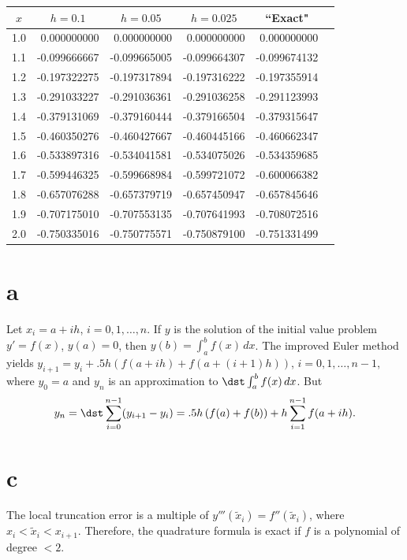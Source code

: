 \documentclass[dvips]{book}
\renewcommand{\exer}[1]{\par\medskip\;\noindent{\color{red}\bf #1.}}
\numberwithin{example}{section}
\numberwithin{equation}{section}
\numberwithin{theorem}{section}
\numberwithin{table}{section}
\numberwithin{figure}{section}
\begin{document}
\exer{3.2.30}
{\small
\begin{tabular}{|c|r|r|r|r|r|}
\hline
\multicolumn{1}{|c|}{$x$}&
\multicolumn{1}{|c|}{$h=0.1$}&
\multicolumn{1}{|c|}{$h=0.05$}&
\multicolumn{1}{|c|}{$h=0.025$}&
\multicolumn{1}{|c|}{``Exact"}\\ \hline
1.0 & 0.000000000 & 0.000000000  &  0.000000000 &  0.000000000 \\
1.1 &-0.099666667 &-0.099665005  & -0.099664307 & -0.099674132 \\
1.2 &-0.197322275 &-0.197317894  & -0.197316222 & -0.197355914 \\
1.3 &-0.291033227 &-0.291036361  & -0.291036258 & -0.291123993 \\
1.4 &-0.379131069 &-0.379160444  & -0.379166504 & -0.379315647 \\
1.5 &-0.460350276 &-0.460427667  & -0.460445166 & -0.460662347 \\
1.6 &-0.533897316 &-0.534041581  & -0.534075026 & -0.534359685 \\
1.7 &-0.599446325 &-0.599668984  & -0.599721072 & -0.600066382 \\
1.8 &-0.657076288 &-0.657379719  & -0.657450947 & -0.657845646 \\
1.9 &-0.707175010 &-0.707553135  & -0.707641993 & -0.708072516 \\
2.0 &-0.750335016 &-0.750775571  & -0.750879100 & -0.751331499 \\
\hline
\end{tabular}}


\exer{3.2.32}
\part{a}
Let $x_i=a+ih$, $i=0,1,\dots,n$. If $y$ is the solution of the initial
value problem $y'=f(x)$, $y(a)=0$, then $y(b)=\int_a^bf(x)\,dx$.
The improved  Euler method yields
$y_{i+1}=y_i+.5h\left(f(a+ih)+f(a+(i+1)h)\right)$,
$i=0,1,\dots,n-1$,
where $y_0=a$ and $y_n$ is an approximation to $\dst\int_a^bf(x)\,dx$.
But
$$
y_n=\dst\sum_{i=0}^{n-1}(y_{i+1}-y_i) =.5h\left(f(a)+f(b)\right)
+h\sum_{i=1}^{n-1}f(a+ih).
$$


\part{c} The local truncation error is a multiple of
$y'''(\tilde x_i)=f''(\tilde x_i)$, where $x_i<\tilde
x_i<x_{i+1}$. Therefore, the quadrature formula is exact
if $f$ is a polynomial of degree  $<2$.
\end{document}
